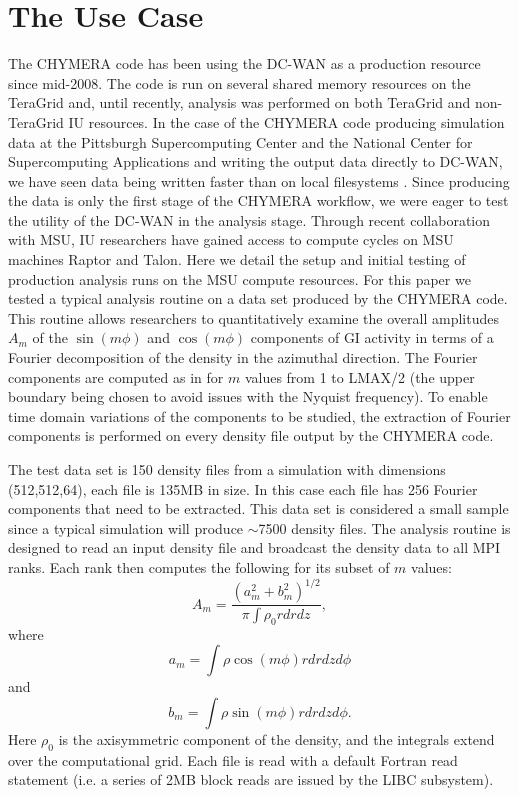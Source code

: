 \documentclass[]{sig-alternate}
\begin{document}
\section {The Use Case}\label{sec:usecase}
The CHYMERA code has been using the DC-WAN as a production resource since mid-2008. The code is run on several shared memory resources on the TeraGrid and, until recently, analysis was performed on both TeraGrid and non-TeraGrid IU resources. In the case of  the CHYMERA code producing simulation data at the Pittsburgh Supercomputing Center and the National Center for Supercomputing Applications and writing the output data directly to DC-WAN, we have seen data being written faster than on local filesystems \cite{henschel2010}. Since producing the data is only the first stage of the CHYMERA workflow, we were eager to test the utility of the DC-WAN in the analysis stage. Through recent collaboration with MSU, IU researchers have gained access to compute cycles on MSU machines Raptor and Talon. Here we detail the setup and initial testing of production analysis runs on the MSU compute resources.   
For this paper we tested a typical analysis routine on a data set produced by the CHYMERA code. This routine allows researchers to quantitatively examine the overall amplitudes $A_m$ of the $\sin(m\phi)$ and $\cos(m\phi)$ components of GI activity in terms of a Fourier decomposition of the density in the azimuthal direction. The Fourier components are computed as in \cite{imamura2000} for $m$ values from 1 to LMAX/2 (the upper boundary being chosen to avoid issues with the Nyquist frequency). To enable time domain variations of the components to be studied, the extraction of Fourier components is performed on every density file output by the CHYMERA code.

The test data set is 150 density files from a simulation with dimensions (512,512,64), each file is 135MB in size. In this case each file has 256 Fourier components that need to be extracted. This data set is considered a small sample since a typical simulation will produce $\sim$7500 density files.  The analysis routine is designed to read an input density file and broadcast the density data to all MPI ranks. Each rank then computes the following for its subset of $m$ values: 
\begin{equation}
A_{m} =\frac{(a^2_{m}+b^2_{m})^{1/2}}{\pi\int\rho_0 r dr dz},
\end{equation}
where
\begin{equation}
a_m = \int \rho \cos (m\phi) r dr dz d\phi
\end{equation}
and
\begin{equation}
b_m = \int \rho \sin (m\phi) r dr dz d\phi .
\end{equation}
Here $\rho_0$ is the axisymmetric component of the density, and the integrals extend over the computational grid. Each file is read with a default Fortran read statement (i.e. a series of 2MB block reads are issued by the LIBC subsystem). 
\end{document}
